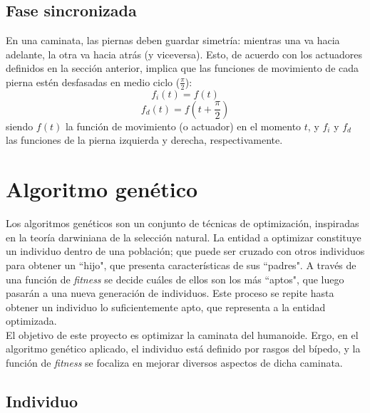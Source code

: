 \documentclass{article}
\begin{document}
\subsection{Fase sincronizada}
En una caminata, las piernas deben guardar simetr\'ia: mientras una va hacia adelante, la otra va hacia atr\'as (y viceversa). Esto, de acuerdo con  los actuadores definidos en la secci\'on anterior, implica que las funciones de movimiento de cada pierna est\'en desfasadas en medio ciclo ($\frac{\pi}{2}$):
\begin{equation}
f_{i}(t) =  f(t)
 \end{equation}
 \begin{equation}
f_{d}(t) =  f(t+\frac{\pi}{2})
 \end{equation}
siendo $f(t)$ la funci\'on de movimiento (o actuador) en el momento $t$, y $f_{i}$ y $f_{d}$ las funciones de la pierna izquierda y derecha, respectivamente.



\section{Algoritmo gen\'etico}

Los algoritmos gen\'eticos son un conjunto de t\'ecnicas de optimizaci\'on, inspiradas en la teor\'ia darwiniana de la selecci\'on natural. La entidad a optimizar constituye un individuo dentro de una poblaci\'on; que puede ser cruzado con otros individuos para obtener un ``hijo", que presenta caracter\'isticas de sus ``padres". A trav\'es de una funci\'on de \textit{fitness} se decide cu\'ales de ellos son los m\'as ``aptos", que luego pasar\'an a una nueva generaci\'on de individuos. Este proceso se repite hasta obtener un individuo lo suficientemente apto, que representa a la entidad optimizada.\\
El objetivo de este proyecto es optimizar la caminata del humanoide. Ergo, en el algoritmo gen\'etico aplicado, el individuo est\'a definido por rasgos del b\'ipedo, y la funci\'on de \textit{fitness} se focaliza en mejorar diversos aspectos de dicha caminata.

\subsection{Individuo}
\end{document}
